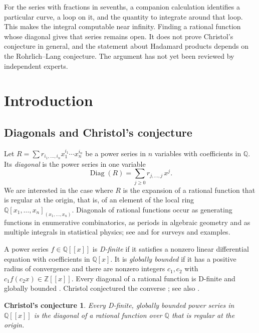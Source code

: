 \documentclass[11pt]{amsart}
\newtheorem*{conjecture*}{Christol's conjecture}
\theoremstyle{definition}
\theoremstyle{remark}
\numberwithin{equation}{section}
\newcommand{\Q}{\mathbb{Q}}
\newcommand{\Z}{\mathbb{Z}}
\DeclareMathOperator{\Diag}{Diag}
\begin{document}
For the series with fractions in sevenths, a companion calculation identifies a particular curve, a loop on it, and the quantity to integrate around that loop. This makes the integral computable near infinity. Finding a rational function whose diagonal gives that series remains open. It does not prove Christol's conjecture in general, and the statement about Hadamard products depends on the Rohrlich--Lang conjecture. The argument has not yet been reviewed by independent experts.

\setcounter{tocdepth}{1}
\tableofcontents

\section{Introduction}\label{sec:intro}

\subsection{Diagonals and Christol's conjecture}
Let $R=\sum r_{i_1,\dots,i_n}x_1^{i_1}\cdots x_n^{i_n}$ be a power series in $n$ variables with coefficients in $\Q$. Its \emph{diagonal} is the power series in one variable
\[
\Diag(R)=\sum_{j\ge0}r_{j,\dots,j}\,x^j .
\]
We are interested in the case where $R$ is the expansion of a rational function that is regular at the origin, that is, of an element of the local ring $\Q[x_1,\dots,x_n]_{(x_1,\dots,x_n)}$. Diagonals of rational functions occur as generating functions in enumerative combinatorics, as periods in algebraic geometry and as multiple integrals in statistical physics; see \citet{Christol2015} and \citet{BostanEtAl2013} for surveys and examples.

A power series $f\in\Q[[x]]$ is \emph{D-finite} if it satisfies a nonzero linear differential equation with coefficients in $\Q[x]$. It is \emph{globally bounded} if it has a positive radius of convergence and there are nonzero integers $c_1,c_2$ with $c_1f(c_2x)\in\Z[[x]]$. Every diagonal of a rational function is D-finite \citep{Christol1985,Lipshitz1988} and globally bounded \citep{Christol1990}. Christol conjectured the converse \citep{Christol1987,Christol1990}; see also \citet[Conjecture~10]{Christol2015}.

\begin{conjecture*}
Every D-finite, globally bounded power series in $\Q[[x]]$ is the diagonal of a rational function over $\Q$ that is regular at the origin.
\end{conjecture*}
\end{document}
